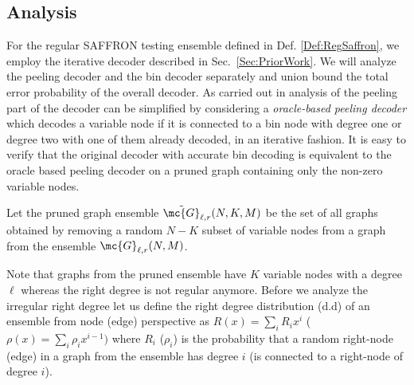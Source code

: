 \documentclass[conference,twocolumn]{IEEEtran}
\begin{document}
\subsection*{Analysis}
For the regular SAFFRON testing ensemble defined in Def. \ref{Def:RegSaffron}, we employ the iterative decoder described in Sec.~\ref{Sec:PriorWork}. We will
analyze the peeling decoder and the bin decoder separately and union bound the total error probability of the overall decoder. As carried out in \cite{lee2015saffron} analysis of the peeling part of the decoder can be simplified by considering a \textit{oracle-based peeling decoder} which decodes a variable node if it is connected to a bin node with degree one or degree two with one of them already decoded, in an iterative fashion. It is easy to verify that the original decoder with accurate bin decoding is equivalent to the oracle based peeling decoder on a pruned graph containing only the non-zero variable nodes.
\begin{definition}
Let the pruned graph ensemble $\tilde{\mc{G}}_{\ell,r}(N,K,M)$ be the set of all graphs obtained by removing a random $N-K$ subset of variable nodes from a graph from the ensemble $\mc{G}_{\ell,r}(N,M)$.
\end{definition}
Note that graphs from the pruned ensemble have $K$ variable nodes with a degree $\ell$ whereas the right degree is not regular anymore. Before we analyze the irregular right degree let us define the right degree distribution (d.d) of an ensemble from node (edge) perspective as $R(x)=\sum_{i}R_i x^i$ ($\rho(x)=\sum_{i}\rho_i x^{i-1})$ where $R_i$ ($\rho_i$) is the probability that a random right-node (edge) in a graph from the ensemble has degree $i$ (is connected to a right-node of degree $i$).
\end{document}

